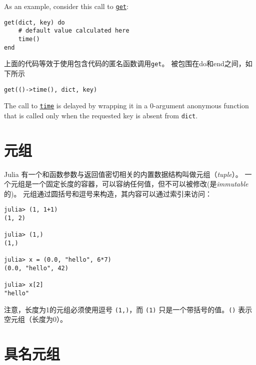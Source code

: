 As an example, consider this call to \hyperlink{282460992333585641}{\texttt{get}}:




\begin{verbatim}
get(dict, key) do
    # default value calculated here
    time()
end
\end{verbatim}



上面的代码等效于使用包含代码的匿名函数调用\texttt{get}。 被包围在do和end之间，如下所示




\begin{verbatim}
get(()->time(), dict, key)
\end{verbatim}



The call to \hyperlink{2441622941271736623}{\texttt{time}} is delayed by wrapping it in a 0-argument anonymous function that is called only when the requested key is absent from \texttt{dict}.



\hypertarget{9218398227562398910}{}


\section{元组}



Julia 有一个和函数参数与返回值密切相关的内置数据结构叫做元组（\emph{tuple}）。 一个元组是一个固定长度的容器，可以容纳任何值，但不可以被修改(是\emph{immutable}的)。 元组通过圆括号和逗号来构造，其内容可以通过索引来访问：




\begin{verbatim}
julia> (1, 1+1)
(1, 2)

julia> (1,)
(1,)

julia> x = (0.0, "hello", 6*7)
(0.0, "hello", 42)

julia> x[2]
"hello"
\end{verbatim}



注意，长度为1的元组必须使用逗号 \texttt{(1,)}，而 \texttt{(1)} 只是一个带括号的值。\texttt{()} 表示空元组（长度为0）。



\hypertarget{14936898299796428859}{}


\section{具名元组}



